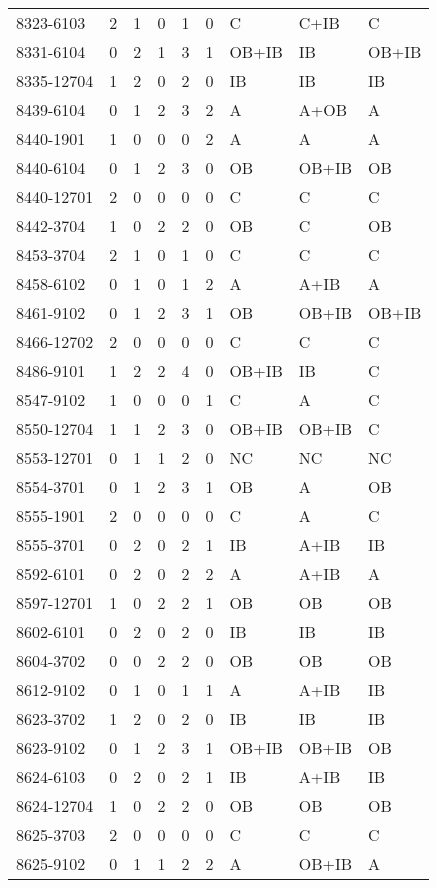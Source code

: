 \begin{longtable}{p{2.1cm}p{0.8cm}p{0.8cm}p{0.8cm}p{0.8cm}p{0.8cm}p{1.5cm}p{1.5cm}p{1.2cm}}
8323-6103 & 2 & 1 & 0 & 1 & 0 & C & C+IB & C \\
8331-6104 & 0 & 2 & 1 & 3 & 1 & OB+IB & IB & OB+IB \\
8335-12704 & 1 & 2 & 0 & 2 & 0 & IB & IB & IB \\
8439-6104 & 0 & 1 & 2 & 3 & 2 & A & A+OB & A \\
8440-1901 & 1 & 0 & 0 & 0 & 2 & A & A & A \\
8440-6104 & 0 & 1 & 2 & 3 & 0 & OB & OB+IB & OB \\
8440-12701 & 2 & 0 & 0 & 0 & 0 & C & C & C \\
8442-3704 & 1 & 0 & 2 & 2 & 0 & OB & C & OB \\
8453-3704 & 2 & 1 & 0 & 1 & 0 & C & C & C \\
8458-6102 & 0 & 1 & 0 & 1 & 2 & A & A+IB & A \\
8461-9102 & 0 & 1 & 2 & 3 & 1 & OB & OB+IB & OB+IB \\
8466-12702 & 2 & 0 & 0 & 0 & 0 & C & C & C \\
8486-9101 & 1 & 2 & 2 & 4 & 0 & OB+IB & IB & C \\
8547-9102 & 1 & 0 & 0 & 0 & 1 & C & A & C \\
8550-12704 & 1 & 1 & 2 & 3 & 0 & OB+IB & OB+IB & C \\
8553-12701 & 0 & 1 & 1 & 2 & 0 & NC & NC & NC \\
8554-3701 & 0 & 1 & 2 & 3 & 1 & OB & A & OB \\
8555-1901 & 2 & 0 & 0 & 0 & 0 & C & A & C \\
8555-3701 & 0 & 2 & 0 & 2 & 1 & IB & A+IB & IB \\
8592-6101 & 0 & 2 & 0 & 2 & 2 & A & A+IB & A \\
8597-12701 & 1 & 0 & 2 & 2 & 1 & OB & OB & OB \\
8602-6101 & 0 & 2 & 0 & 2 & 0 & IB & IB & IB \\
8604-3702 & 0 & 0 & 2 & 2 & 0 & OB & OB & OB \\
8612-9102 & 0 & 1 & 0 & 1 & 1 & A & A+IB & IB \\
8623-3702 & 1 & 2 & 0 & 2 & 0 & IB & IB & IB \\
8623-9102 & 0 & 1 & 2 & 3 & 1 & OB+IB & OB+IB & OB \\
8624-6103 & 0 & 2 & 0 & 2 & 1 & IB & A+IB & IB \\
8624-12704 & 1 & 0 & 2 & 2 & 0 & OB & OB & OB \\
8625-3703 & 2 & 0 & 0 & 0 & 0 & C & C & C \\
8625-9102 & 0 & 1 & 1 & 2 & 2 & A & OB+IB & A \\

\end{longtable}
